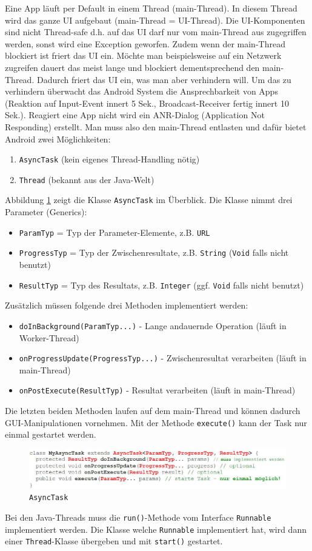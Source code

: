 Eine App läuft per Default in einem Thread (main-Thread). In diesem Thread wird das ganze UI aufgebaut (main-Thread = UI-Thread). Die UI-Komponenten sind nicht Thread-safe d.h. auf das UI darf nur vom main-Thread aus zugegriffen werden, sonst wird eine Exception geworfen. Zudem wenn der main-Thread blockiert ist friert das UI ein. Möchte man beispielsweise auf ein Netzwerk zugreifen dauert das meist lange und blockiert dementsprechend den main-Thread. Dadurch friert das UI ein, was man aber verhindern will. Um das zu verhindern überwacht das Android System die Ansprechbarkeit von Apps (Reaktion auf Input-Event innert 5 Sek., Broadcast-Receiver fertig innert 10 Sek.). Reagiert eine App nicht wird ein ANR-Dialog (Application Not Responding) erstellt.
Man muss also den main-Thread entlasten und dafür bietet Android zwei Möglichkeiten:
\begin{enumerate}
	\item \texttt{AsyncTask} (kein eigenes Thread-Handling nötig)
	\item \texttt{Thread} (bekannt aus der Java-Welt)
\end{enumerate}
Abbildung \ref{fig:asynctask} zeigt die Klasse \texttt{AsyncTask} im Überblick. Die Klasse nimmt drei Parameter (Generics):
\begin{itemize}
	\item \texttt{ParamTyp} = Typ der Parameter-Elemente, z.B. \texttt{URL}
	\item \texttt{ProgressTyp} = Typ der Zwischenresultate, z.B. \texttt{String} (\texttt{Void} falls nicht benutzt)
	\item \texttt{ResultTyp} = Typ des Resultats, z.B. \texttt{Integer} (ggf. \texttt{Void} falls nicht benutzt)
\end{itemize}
Zusätzlich müssen folgende drei Methoden implementiert werden:
\begin{itemize}
	\item \texttt{doInBackground(ParamTyp...)} - Lange andauernde Operation (läuft in Worker-Thread)
	\item \texttt{onProgressUpdate(ProgressTyp...)} - Zwischenresultat verarbeiten (läuft in main-Thread)
	\item \texttt{onPostExecute(ResultTyp)} - Resultat verarbeiten (läuft in main-Thread)
\end{itemize}
Die letzten beiden Methoden laufen auf dem main-Thread und können dadurch GUI-Manipulationen vornehmen. Mit der Methode \texttt{execute()} kann der Task nur einmal gestartet werden.

\begin{figure}
\centering
\includegraphics[width=\linewidth]{fig/asynctask}
\caption{\texttt{AsyncTask}}
\label{fig:asynctask}
\end{figure}

Bei den Java-Threads muss die \texttt{run()}-Methode vom Interface \texttt{Runnable} implementiert werden. Die Klasse welche \texttt{Runnable} implementiert hat, wird dann einer \texttt{Thread}-Klasse übergeben und mit \texttt{start()} gestartet. 
